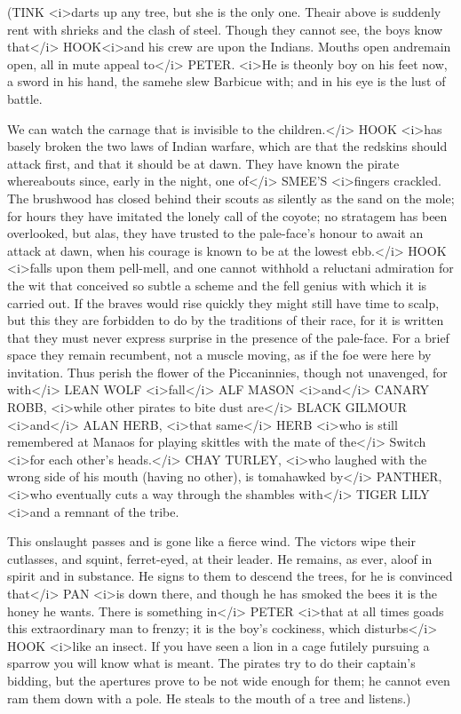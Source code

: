 \begin{stagedir}
(TINK <i>darts up any tree, but she is the only one. Theair above is suddenly rent with shrieks and the clash of steel. Though they cannot see, the boys know that</i> HOOK<i>and his crew are upon the Indians. Mouths open andremain open, all in mute appeal to</i> PETER. <i>He is theonly boy on his feet now, a sword in his hand, the samehe slew Barbicue with; and in his eye is the lust of battle.

We can watch the carnage that is invisible to the children.</i> HOOK <i>has basely broken the two laws of Indian warfare, which are that the redskins should attack first, and that it should be at dawn. They have known the pirate whereabouts since, early in the night, one of</i> SMEE'S <i>fingers crackled. The brushwood has closed behind their scouts as silently as the sand on the mole; for hours they have imitated the lonely call of the coyote; no stratagem has been overlooked, but alas, they have trusted to the pale-face's honour to await an attack at dawn, when his courage is known to be at the lowest ebb.</i> HOOK <i>falls upon them pell-mell, and one cannot withhold a reluctani admiration for the wit that conceived so subtle a scheme and the fell genius with which it is carried out. If the braves would rise quickly they might still have time to scalp, but this they are forbidden to do by the traditions of their race, for it is written that they must never express surprise in the presence of the pale-face. For a brief space they remain recumbent, not a muscle moving, as if the foe were here by invitation. Thus perish the flower of the Piccaninnies, though not unavenged, for with</i> LEAN WOLF <i>fall</i> ALF MASON <i>and</i> CANARY ROBB, <i>while other pirates to bite dust are</i> BLACK GILMOUR <i>and</i> ALAN HERB, <i>that same</i> HERB <i>who is still remembered at Manaos for playing skittles with the mate of the</i> Switch <i>for each other's heads.</i> CHAY TURLEY, <i>who laughed with the wrong side of his mouth (having no other), is tomahawked by</i> PANTHER, <i>who eventually cuts a way through the shambles with</i> TIGER LILY <i>and a remnant of the tribe.

This onslaught passes and is gone like a fierce wind. The victors wipe their cutlasses, and squint, ferret-eyed, at their leader. He remains, as ever, aloof in spirit and in substance. He signs to them to descend the trees, for he is convinced that</i> PAN <i>is down there, and though he has smoked the bees it is the honey he wants. There is something in</i> PETER <i>that at all times goads this extraordinary man to frenzy; it is the boy's cockiness, which disturbs</i> HOOK <i>like an insect. If you have seen a lion in a cage futilely pursuing a sparrow you will know what is meant. The pirates try to do their captain's bidding, but the apertures prove to be not wide enough for them; he cannot even ram them down with a pole. He steals to the mouth of a tree and listens.)
\end{stagedir}


